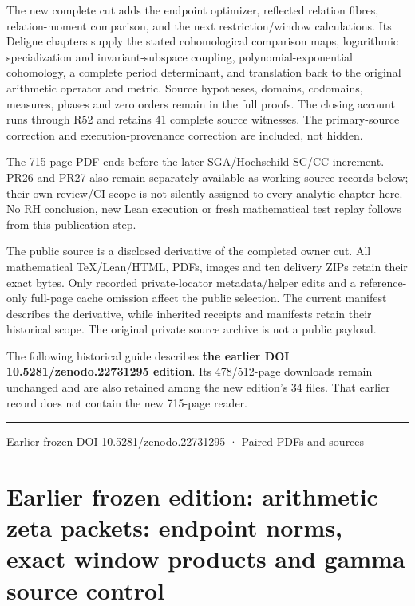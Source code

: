 \documentclass[
]{article}
\begin{document}
The new complete cut adds the endpoint optimizer, reflected relation
fibres, relation-moment comparison, and the next restriction/window
calculations. Its Deligne chapters supply the stated cohomological
comparison maps, logarithmic specialization and invariant-subspace
coupling, polynomial-exponential cohomology, a complete period
determinant, and translation back to the original arithmetic operator
and metric. Source hypotheses, domains, codomains, measures, phases and
zero orders remain in the full proofs. The closing account runs through
R52 and retains 41 complete source witnesses. The primary-source
correction and execution-provenance correction are included, not hidden.

The 715-page PDF ends before the later SGA/Hochschild SC/CC increment.
PR26 and PR27 also remain separately available as working-source records
below; their own review/CI scope is not silently assigned to every
analytic chapter here. No RH conclusion, new Lean execution or fresh
mathematical test replay follows from this publication step.

The public source is a disclosed derivative of the completed owner cut.
All mathematical TeX/Lean/HTML, PDFs, images and ten delivery ZIPs
retain their exact bytes. Only recorded private-locator metadata/helper
edits and a reference-only full-page cache omission affect the public
selection. The current manifest describes the derivative, while
inherited receipts and manifests retain their historical scope. The
original private source archive is not a public payload.

The following historical guide describes \textbf{the earlier DOI
10.5281/zenodo.22731295 edition}. Its 478/512-page downloads remain
unchanged and are also retained among the new edition's 34 files. That
earlier record does not contain the new 715-page reader.

\begin{center}\rule{0.5\linewidth}{0.5pt}\end{center}

\href{https://doi.org/10.5281/zenodo.22731295}{Earlier frozen DOI
10.5281/zenodo.22731295} ·
\href{calculation_edition_20260913_endpoint_gamma/README.md}{Paired PDFs
and sources}

\section{Earlier frozen edition: arithmetic zeta packets: endpoint
norms, exact window products and gamma source
control}\label{earlier-frozen-edition-arithmetic-zeta-packets-endpoint-norms-exact-window-products-and-gamma-source-control}
\end{document}
